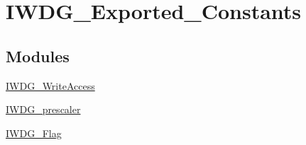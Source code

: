 \hypertarget{group__IWDG__Exported__Constants}{
\section{IWDG\_\-Exported\_\-Constants}
\label{group__IWDG__Exported__Constants}
}
\subsection*{Modules}
\begin{DoxyCompactItemize}
\item 
\hyperlink{group__IWDG__WriteAccess}{IWDG\_\-WriteAccess}
\item 
\hyperlink{group__IWDG__prescaler}{IWDG\_\-prescaler}
\item 
\hyperlink{group__IWDG__Flag}{IWDG\_\-Flag}
\end{DoxyCompactItemize}
